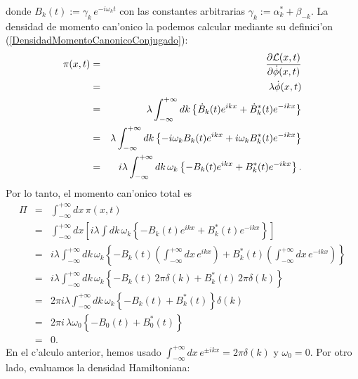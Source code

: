 donde $B_k(t):=\gamma_k\, e^{-i\omega_kt}$  con las constantes arbitrarias
$\gamma_k:=\alpha^*_k +\beta_{-k}$. La densidad de momento can'onico la podemos
calcular mediante su
definici'on (\ref{DensidadMomentoCanonicoConjugado}): 
\begin{eqnarray}
\pi(x,t) & = &\frac{\partial{\cal L}(x,t)}{\partial\dot{\phi}(x,t) }\\
& = &\lambda\dot{\phi}(x,t) \\
& = &\lambda\int_{-\infty}^{+\infty} dk\left\{ \dot{B}_k(t)
e^{ikx}+\dot{B}_k^{\ast
}(t) e^{-ikx}\right\}  \\
& = &\lambda\int_{-\infty}^{+\infty} dk\left\{ -i\omega_kB_k(t) e^{ikx}+i\omega
_kB_k^{\ast}(t) e^{-ikx}\right\} \\
& = &i\lambda\int_{-\infty}^{+\infty} dk\,\omega_k\left\{ -B_k(t)
e^{ikx}+B_k^{\ast
}(t) e^{-ikx}\right\}. \label{Pi1} 
\end{eqnarray}
Por lo tanto, el momento can'onico total es
\begin{eqnarray}
\Pi & = &\int_{-\infty}^{+\infty} dx\,\pi(x,t) \\
& = &\int_{-\infty}^{+\infty} dx\left[ i\lambda\int dk\,\omega_k\left\{ -B_k(t)
e^{ikx}+B_k^{\ast}(t) e^{-ikx}\right\} \right] \\
& = &i\lambda\int_{-\infty}^{+\infty} dk\,\omega_k\left\{ -B_k(t) \left(
\int_{-\infty}^{+\infty}
dx\, e^{ikx}\right) +B_k^{\ast}(t) \left( \int_{-\infty}^{+\infty} dx\,
e^{-ikx}\right) \right\}  \\
& = &i\lambda\int_{-\infty}^{+\infty} dk\,\omega_k\left\{ -B_k(t)\,
2\pi\delta(k) +B_k^{\ast}(t)\, 2\pi\delta(k)\right\} \\
& = &2\pi i\lambda\int_{-\infty}^{+\infty} dk\,\omega_k\left\{ -B_k(t)
+B_k^{\ast}(t) \right\} \delta(k) \\
& = &2\pi i\,\lambda\omega_{0}\left\{ -B_{0}(t) +B_{0}^{\ast}(t) \right\}\\
& = &0 .
\end{eqnarray}
 En el c'alculo anterior, hemos usado $\int_{-\infty}^{+\infty} dx\,e^{\pm
ikx}=2\pi\delta\left(
k\right)$ y $\omega_{0}=0$. Por otro lado, evaluamos la densidad Hamiltoniana:
